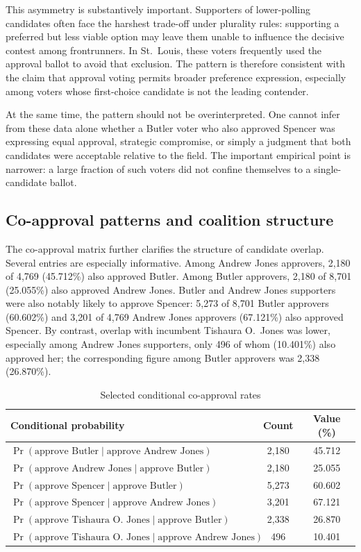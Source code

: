 \documentclass[11pt]{article}
\begin{document}
This asymmetry is substantively important. Supporters of lower-polling candidates often face the harshest trade-off under plurality rules: supporting a preferred but less viable option may leave them unable to influence the decisive contest among frontrunners. In St.~Louis, these voters frequently used the approval ballot to avoid that exclusion. The pattern is therefore consistent with the claim that approval voting permits broader preference expression, especially among voters whose first-choice candidate is not the leading contender.

At the same time, the pattern should not be overinterpreted. One cannot infer from these data alone whether a Butler voter who also approved Spencer was expressing equal approval, strategic compromise, or simply a judgment that both candidates were acceptable relative to the field. The important empirical point is narrower: a large fraction of such voters did not confine themselves to a single-candidate ballot.

\subsection{Co-approval patterns and coalition structure}
The co-approval matrix further clarifies the structure of candidate overlap. Several entries are especially informative. Among Andrew Jones approvers, 2,180 of 4,769 (45.712\%) also approved Butler. Among Butler approvers, 2,180 of 8,701 (25.055\%) also approved Andrew Jones. Butler and Andrew Jones supporters were also notably likely to approve Spencer: 5,273 of 8,701 Butler approvers (60.602\%) and 3,201 of 4,769 Andrew Jones approvers (67.121\%) also approved Spencer. By contrast, overlap with incumbent Tishaura O.~Jones was lower, especially among Andrew Jones supporters, only 496 of whom (10.401\%) also approved her; the corresponding figure among Butler approvers was 2,338 (26.870\%).

\begin{table}[htbp]
\centering
\caption{Selected conditional co-approval rates}
\label{tab:coapproval}
\begin{tabular}{p{8cm}cc}
\toprule
Conditional probability & Count & Value (\%) \\
\midrule
$\Pr(\text{approve Butler} \mid \text{approve Andrew Jones})$ & 2,180 & 45.712 \\
$\Pr(\text{approve Andrew Jones} \mid \text{approve Butler})$ & 2,180 & 25.055 \\
$\Pr(\text{approve Spencer} \mid \text{approve Butler})$ & 5,273 & 60.602 \\
$\Pr(\text{approve Spencer} \mid \text{approve Andrew Jones})$ & 3,201 & 67.121 \\
$\Pr(\text{approve Tishaura O.~Jones} \mid \text{approve Butler})$ & 2,338 & 26.870 \\
$\Pr(\text{approve Tishaura O.~Jones} \mid \text{approve Andrew Jones})$ & 496 & 10.401 \\
\bottomrule
\end{tabular}
\end{table}
\end{document}
